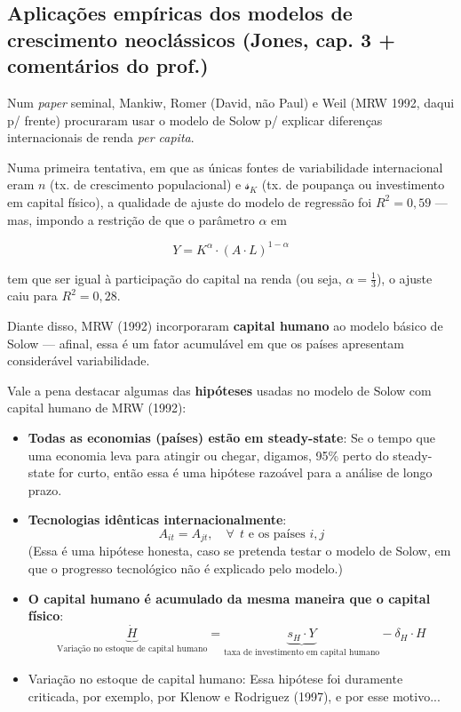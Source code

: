 \documentclass[a4paper,12pt]{article}[abntex2]
\begin{document}
\subsection{\textbf{Aplicações empíricas dos modelos de crescimento neoclássicos (Jones, cap. 3 + comentários do prof.)}}

Num \textit{paper} seminal, Mankiw, Romer (David, não Paul) e Weil (MRW 1992, daqui p/ frente) procuraram usar o modelo de Solow p/ explicar diferenças internacionais de renda \textit{per capita}.

Numa primeira tentativa, em que as únicas fontes de variabilidade internacional eram \( n \) (tx. de crescimento populacional) e \( \mathcal{s}_K \) (tx. de poupança ou investimento em capital físico), a qualidade de ajuste do modelo de regressão foi \( R^2 = 0,59 \) — mas, impondo a restrição de que o parâmetro \( \alpha \) em

\[
Y = K^\alpha \cdot (A \cdot L)^{1-\alpha}
\]

tem que ser igual à participação do capital na renda (ou seja, \( \alpha = \frac{1}{3} \)), o ajuste caiu para \( R^2 = 0,28 \).

Diante disso, MRW (1992) incorporaram \textbf{capital humano} ao modelo básico de Solow — afinal, essa é um fator acumulável em que os países apresentam considerável variabilidade.

Vale a pena destacar algumas das \textbf{hipóteses} usadas no modelo de Solow com capital humano de MRW (1992):

\begin{itemize}
    \item\textbf{Todas as economias (países) estão em steady-state}: 
    Se o tempo que uma economia leva para atingir ou chegar, digamos, 95\% perto do steady-state for curto, então essa é uma hipótese razoável para a análise de longo prazo.
    
    \item \textbf{Tecnologias idênticas internacionalmente}: 
    \[
    A_{it} = A_{jt}, \quad \forall  \ \ t \text{ e os países } i, j
    \]
    (Essa é uma hipótese honesta, caso se pretenda testar o modelo de Solow, em que o progresso tecnológico não é explicado pelo modelo.)
    
    \item \textbf{O capital humano é acumulado da mesma maneira que o capital físico}: 
    \[
    \underbrace{\dot{H}}_{\text{Variação no estoque de capital humano}} = 
    \underbrace{s_H \cdot Y}_{\text{taxa de investimento em capital humano}} - 
    \delta_H \cdot H
    \]
    \item Variação no estoque de capital humano: Essa hipótese foi duramente criticada, por exemplo, por Klenow e Rodriguez (1997), e por esse motivo...
\end{itemize}
\end{document}
